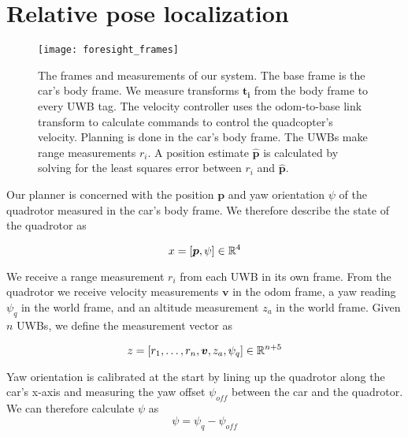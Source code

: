 
\section{Relative pose localization}

\begin{figure}
  \centering
    \texttt{[image: foresight\_frames]}
  \caption{The frames and measurements of our system. The base frame
   is the car's body frame. We measure transforms $\bm{t_{i}}$ from the body
   frame to every UWB tag. The velocity controller uses the odom-to-base\textunderscore 
   link transform to calculate commands to control the quadcopter's velocity.
   Planning is done in the car's body frame.
   The UWBs make range measurements $r_{i}$. A position estimate $\bm{\hat{p}}$
   is calculated by solving for the least squares error between $r_{i}$ and $\bm{\hat{p}}$.}
  \label{fig:frames}
\end{figure}

Our planner is concerned with the position $\bm{p}$ and yaw orientation $\psi$
of the quadrotor measured in the car's body frame. We therefore describe the state of the quadrotor as

$$
    x = [\bm{p}, \psi] \in \mathbb{R}^4
$$

We receive a range measurement $r_i$ from each UWB in its own frame. 
From the quadrotor we receive velocity measurements $\bm{v}$ in the odom frame,
a yaw reading $\psi_q$ in the world frame, and an altitude measurement $z_a$ in 
the world frame. Given $n$ UWBs, we define the measurement vector as

$$
   z = [r_1, \dots, r_n, \bm{v}, z_a, \psi_q] \in \mathbb{R}^{n+5}
$$



Yaw orientation is calibrated at the start by lining up the quadrotor along the car's x-axis
and measuring the yaw offset $\psi_{off}$ between the car and the quadrotor.
We can therefore calculate $\psi$ as
$$
   \psi = \psi_q - \psi_{off}
$$

